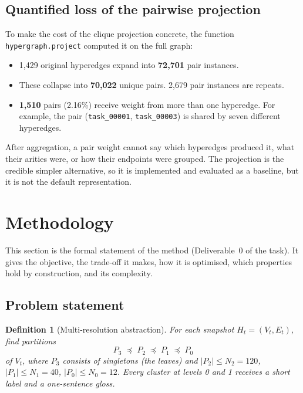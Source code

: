 \documentclass[11pt,a4paper]{article}
\newtheorem{definition}{Definition}[section]
\theoremstyle{remark}
\newcommand{\code}[1]{\texttt{\small #1}}
\begin{document}
\subsection{Quantified loss of the pairwise projection}
\label{sec:projloss}

To make the cost of the clique projection concrete, the function \code{hypergraph.project}
computed it on the full graph:

\begin{itemize}
  \item 1{,}429 original hyperedges expand into \textbf{72{,}701} pair instances.
  \item These collapse into \textbf{70{,}022} unique pairs. 2{,}679 pair instances
        are repeats.
  \item \textbf{1{,}510} pairs (2.16\%) receive weight from more than one hyperedge.
        For example, the pair (\code{task\_00001}, \code{task\_00003}) is shared by
        seven different hyperedges.
\end{itemize}

After aggregation, a pair weight cannot say which hyperedges produced it, what their
arities were, or how their endpoints were grouped. The projection is the credible
simpler alternative, so it is implemented and evaluated as a baseline, but it is not the
default representation.

\section{Methodology}
\label{sec:method}

This section is the formal statement of the method (Deliverable~0 of the task). It
gives the objective, the trade-off it makes, how it is optimised, which properties
hold by construction, and its complexity.

\subsection{Problem statement}

\begin{definition}[Multi-resolution abstraction]
For each snapshot $H_t=(V_t,E_t)$, find partitions
\[
  P_3\;\preceq\;P_2\;\preceq\;P_1\;\preceq\;P_0
\]
of $V_t$, where $P_3$ consists of singletons (the leaves) and
$|P_2|\le N_2=120$, $|P_1|\le N_1=40$, $|P_0|\le N_0=12$. Every cluster at levels 0
and 1 receives a short label and a one-sentence gloss.
\end{definition}
\end{document}
